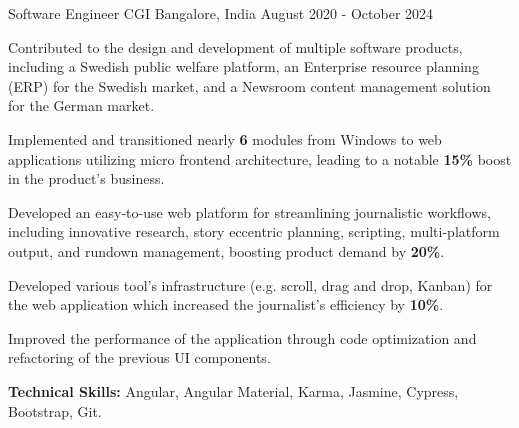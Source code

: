 \begin{cventries}
  \cventry
    {Software Engineer} %
    {CGI} %
    {Bangalore, India} %
    {August 2020 - October 2024} %
    {
      \begin{cvitems} %
        \item {Contributed to the design and development of multiple software products, including a Swedish public welfare platform, an Enterprise resource planning (ERP) for the Swedish market, and a Newsroom content management solution for the German market.}
        \item {Implemented and transitioned nearly {\textbf{6}} modules from Windows to web applications utilizing micro frontend architecture, leading to a notable {\textbf{15\%}} boost in the product's business.}
        \item {Developed an easy-to-use web platform for streamlining journalistic workflows, including innovative research, story eccentric planning, scripting, multi-platform output, and rundown management, boosting product demand by {\textbf{20\%}}.}
        \item {Developed various tool’s infrastructure (e.g. scroll, drag and drop, Kanban) for the web application which increased the journalist’s efficiency by {\textbf{10\%}}.}
        \item {Improved the performance of the application through code optimization and refactoring of the previous UI components.}
        \item {\textbf{Technical Skills:} Angular, Angular Material, Karma, Jasmine, Cypress, Bootstrap, Git.}
      \end{cvitems}
    }

\end{cventries}
